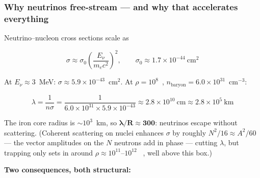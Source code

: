 \subsubsection{Why neutrinos free-stream --- and why that accelerates everything}
\label{sec:freestreaming}

Neutrino--nucleon cross sections scale as \citep[][where
$\sigma_0 = (4/\pi)G_F^2(m_ec^2)^2/(\hbar c)^4 = 1.761\times10^{-44}$~cm$^2$]
{janka2017}

\begin{equation*}
\sigma \approx \sigma_0\left(\frac{E_\nu}{m_e c^2}\right)^{\!2}, \qquad
\sigma_0 \approx 1.7\times10^{-44}\ \mathrm{cm^2}
\end{equation*}

At $E_\nu \approx 3$~MeV: $\sigma \approx 5.9\times10^{-43}$~cm$^2$. At
$\rho = 10^{8}$~\gcc, $n_{\mathrm{baryon}} = 6.0\times10^{31}$~cm$^{-3}$:

\begin{equation*}
\lambda = \frac{1}{n\sigma}
        = \frac{1}{6.0\times10^{31}\times 5.9\times10^{-43}}
        \approx 2.8\times10^{10}\ \mathrm{cm}
        \approx 2.8\times10^{5}\ \mathrm{km}
\end{equation*}

The iron core radius is ${\sim}10^{3}$~km, so
$\boldsymbol{\lambda/R \approx 300}$: neutrinos escape without scattering.
(Coherent scattering on nuclei enhances $\sigma$ by roughly
$N^2/16 \approx A^2/60$ --- the vector amplitudes on the $N$ neutrons add in
phase \citep{janka2017} --- cutting $\lambda$, but trapping only sets in around
$\rho \approx 10^{11}$--$10^{12}$~\gcc{} \citep{janka2017}, well above this
box.)

\textbf{Two consequences, both structural:}

